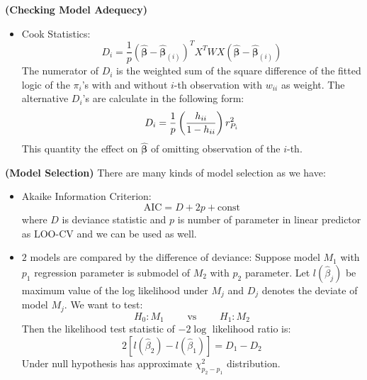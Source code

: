 \begin{remark}{\textbf{(Checking Model Adequecy)}}
\begin{itemize}
\begin{equation*}
           r_{D_i} = \frac{d_i}{\sqrt{1-h_{ii}}}
       \end{equation*}
       Interpretation: This make the $d_i$ directly naturally comparable by unifying their variance and adjust for location in $x$-space. 
       \item Cook Statistics:
       \begin{equation*}
           D_i = \frac{1}{p}(\hat{\boldsymbol \beta} - \hat{\boldsymbol \beta}_{(i)})^TX^TWX(\hat{\boldsymbol \beta} - \hat{\boldsymbol \beta}_{(i)})
       \end{equation*}
       The numerator of $D_i$ is the weighted sum of the square difference of the fitted logic of the $\pi_i$'s with and without $i$-th observation with $w_{ii}$ as weight. The alternative $D_i$'s are calculate in the following form:
       \begin{equation*}
           D_i = \frac{1}{p} \left( \frac{h_{ii}}{1-h_{ii}} \right)r^2_{P_i}
       \end{equation*}
       This quantity the effect on $\hat{\boldsymbol \beta}$ of omitting observation of the $i$-th. 
   \end{itemize} 
\end{remark}

\begin{remark}{\textbf{(Model Selection)}}
   There are many kinds of model selection as we have:
   \begin{itemize}
       \item Akaike Information Criterion: 
       \begin{equation*}
           \text{AIC} = D + 2p + \text{const}
       \end{equation*}
       where $D$ is deviance statistic and $p$ is number of parameter in linear predictor as LOO-CV and we can be used as well. 
       \item $2$ models are compared by the difference of deviance: Suppose model $M_1$ with $p_1$ regression parameter is submodel of $M_2$ with $p_2$ parameter. Let $l(\hat{\beta}_j)$ be maximum value of the log likelihood under $M_j$ and $D_j$ denotes the deviate of model $M_j$. We want to test:
       \begin{equation*}
           H_0 : M_1 \qquad \text{ vs } \qquad H_1 : M_2
       \end{equation*}
       Then the likelihood test statistic of $-2\log$ likelihood ratio is:
       \begin{equation*}
           2[l(\hat{\beta}_2) - l(\hat{\beta}_1)] = D_1 - D_2
       \end{equation*}
       Under null hypothesis has approximate $\chi^2_{p_2-p_1}$ distribution. 
   \end{itemize} 
\end{remark}

